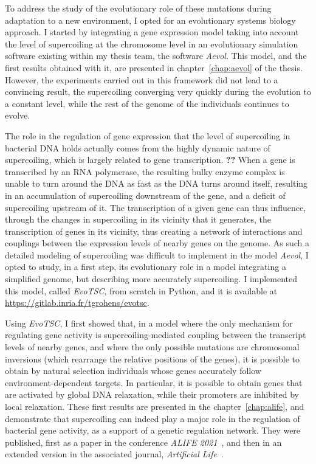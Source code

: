 To address the study of the evolutionary role of these mutations during adaptation to a new environment, I opted for an evolutionary systems biology approach.
I started by integrating a gene expression model taking into account the level of supercoiling at the chromosome level in an evolutionary simulation software existing within my thesis team, the software \emph{Aevol}.
This model, and the first results obtained with it, are presented in chapter~\ref{chap:aevol} of the thesis.
However, the experiments carried out in this framework did not lead to a convincing result, the supercoiling converging very quickly during the evolution to a constant level, while the rest of the genome of the individuals continues to evolve.

The role in the regulation of gene expression that the level of supercoiling in bacterial DNA holds actually comes from the highly dynamic nature of supercoiling, which is largely related to gene transcription. \textbf{??}
When a gene is transcribed by an RNA polymerase, the resulting bulky enzyme complex is unable to turn around the DNA as fast as the DNA turns around itself, resulting in an accumulation of supercoiling downstream of the gene, and a deficit of supercoiling upstream of it.
The transcription of a given gene can thus influence, through the changes in supercoiling in its vicinity that it generates, the transcription of genes in its vicinity, thus creating a network of interactions and couplings between the expression levels of nearby genes on the genome.
As such a detailed modeling of supercoiling was difficult to implement in the model \emph{Aevol}, I opted to study, in a first step, its evolutionary role in a model integrating a simplified genome, but describing more accurately supercoiling.
I implemented this model, called \emph{EvoTSC}, from scratch in Python, and it is available at \url{https://gitlab.inria.fr/tgrohens/evotsc}.

Using \emph{EvoTSC}, I first showed that, in a model where the only mechanism for regulating gene activity is supercoiling-mediated coupling between the transcript levels of nearby genes, and where the only possible mutations are chromosomal inversions (which rearrange the relative positions of the genes), it is possible to obtain by natural selection individuals whose genes accurately follow environment-dependent targets.
In particular, it is possible to obtain genes that are activated by global DNA relaxation, while their promoters are inhibited by local relaxation.
These first results are presented in the chapter~\ref{chap:alife}, and demonstrate that supercoiling can indeed play a major role in the regulation of bacterial gene activity, as a support of a genetic regulation network.
They were published, first as a paper in the conference \emph{ALIFE 2021}~\citep{grohens2021}, and then in an extended version in the associated journal, \emph{Artificial Life}~\citep{grohens2022a}.

